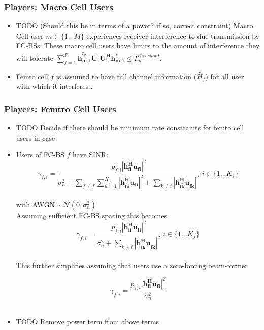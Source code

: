 \documentclass[12pt]{article}
\begin{document}
\subsubsection{Players: Macro Cell Users}

\begin{itemize}
\item 
TODO (Should this be in terms of a power? if so, correct constraint) 
Macro Cell user $m \in \{1 ... M\}$ experiences receiver interference to due transmission by FC-BSs. These macro cell users have limits to the amount of interference they will tolerate 
$\sum^F_{f=1} \mathbf{\tilde{h_{m,f}^T}}  \mathbf{U_f}  \mathbf{U_f^H} \mathbf{\tilde{h_{m,f}^*}} \leq I^{Threshold}_{m} $.

\item Femto cell $f$ is assumed to have full channel information ($\tilde{H_f}$) for all user with which it interferes .
\\
\end{itemize}


\subsubsection{Players: Femtro Cell Users}
\begin{itemize}


\item TODO Decide if there should be minimum rate constraints for femto cell users in case
\\

\item Users of FC-BS $f$ have SINR:
\begin{equation}
\gamma_{f,i} = \frac{p_{f,i}|\mathbf{h^H_{fi}u_{fi}}|^2}
{\sigma^2_{n}  + \sum_{\tilde{f}\neq f} \sum_{u=1}^{K_{\tilde{f}}}
|\mathbf{h^H_{\tilde{f}u}u_{fi}}|^2
 + \sum_{\tilde{k}\neq i}
  |\mathbf{h^H_{f\tilde{k}}u_{f\tilde{k}}}|^2}
  \; i \in \{1 ... K_f\}
\end{equation}
\\
with AWGN $\sim \mathcal{N}(0,\sigma^2_n)$
\\

Assuming sufficient FC-BS spacing this becomes 
\begin{equation}
\gamma_{f,i} = \frac{p_{f,i}|\mathbf{h^H_{fi}u_{fi}}|^2}{\sigma^2_{n}   + \sum_{\tilde{k}\neq i}
  |\mathbf{h^H_{f\tilde{k}}u_{f\tilde{k}}}|^2} \; i \in \{1 ... K_f\}
\end{equation}
\\

This further simplifies assuming that users use a zero-forcing beam-former

\begin{equation}
\gamma_{f,i} = \frac{p_{f,i}|\mathbf{h^H_{fi}u_{fi}}|^2}{\sigma^2_{n} }
\end{equation}
\\

\item TODO Remove power term from above terms
\\

\end{itemize}
\end{document}
